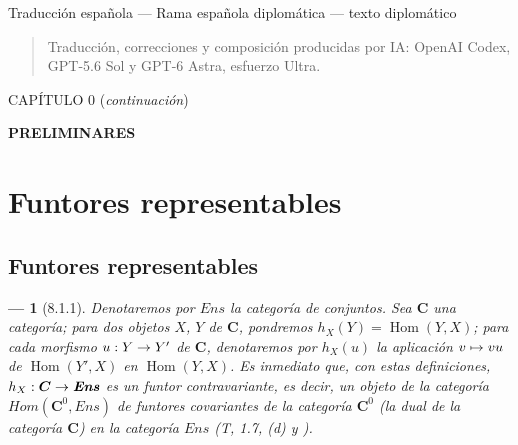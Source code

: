 \documentclass[10pt,oneside,openany]{book}
\makeatletter
\theoremstyle{egaenv}\newtheorem*{env}{---}
\theoremstyle{egastatement}
\theoremstyle{egadescription}
\newcommand{\oldpage}[2][]{\marginnote{\normalfont\scriptsize\textbf{#1}\,|\,#2}\ignorespaces}
\let\ega@shortmapsto\mapsto
\renewcommand{\to}{\mathchoice{\longrightarrow}{\rightarrow}{\rightarrow}{\rightarrow}}
\renewcommand{\mapsto}{\mathchoice{\longmapsto}{\ega@shortmapsto}{\ega@shortmapsto}{\ega@shortmapsto}}
\makeatother
\begin{document}
\begin{center}
\large Traducción española — Rama española diplomática — texto diplomático
\end{center}

\begin{quote}\small
Traducción, correcciones y composición producidas por IA: OpenAI Codex, GPT-5.6 Sol y GPT-6 Astra, esfuerzo Ultra.
\end{quote}

\clearpage
\thispagestyle{plain}
\oldpage[0\textsubscript{III}]{5}
\label{chapter:0III-fr}

\begin{center}
{\large CAPÍTULO 0 (\textit{continuación})\footnotemark\par}
\vspace{1.5em}
{\Large\bfseries PRELIMINARES\par}
\end{center}


\setcounter{section}{7}


\section{Funtores representables}
\label{section:0.8}
\label{section:0.8-fr}

\subsection{Funtores representables}
\label{subsection:0.8.1}
\label{subsection:0.8.1-fr}


\begin{env}[8.1.1]
\label{0.8.1.1}
\label{0.8.1.1-fr}
Denotaremos por $\boldsymbol{\mathit{Ens}}$ la categoría de conjuntos.
Sea $\boldsymbol{C}$ una categoría; para dos objetos $X$, $Y$ de $\boldsymbol{C}$, pondremos $h_X(Y)=\operatorname{Hom}(Y,X)$; para cada morfismo $u:Y\to Y'$ de $\boldsymbol{C}$, denotaremos por $h_X(u)$ la aplicación $v\mapsto vu$ de $\operatorname{Hom}(Y',X)$ en $\operatorname{Hom}(Y,X)$.
Es inmediato que, con estas definiciones, $h_X:\boldsymbol{C}\to\boldsymbol{\mathit{Ens}}$ es un \emph{funtor contravariante}, es decir, un objeto de la categoría $\boldsymbol{\mathit{Hom}}(\boldsymbol{C}^0,\boldsymbol{\mathit{Ens}})$ de funtores covariantes de la categoría $\boldsymbol{C}^0$ (la dual de la categoría $\boldsymbol{C}$) en la categoría $\boldsymbol{\mathit{Ens}}$ (T, 1.7, (\textit{d}) y \cite{III-29}).
\end{env}
\end{document}
